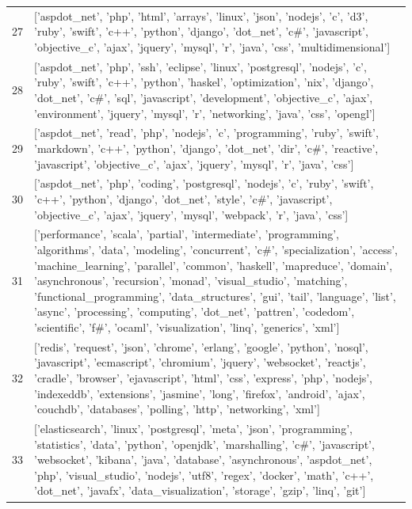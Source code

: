 \begin{center}
\begin{longtable}{|p{1.5cm}|p{12.5cm}|}
            27 & ['aspdot\_net', 'php', 'html', 'arrays', 'linux', 'json', 'nodejs', 'c', 'd3', 'ruby', 'swift', 'c++', 'python', 'django', 'dot\_net', 'c\#', 'javascript', 'objective\_c', 'ajax', 'jquery', 'mysql', 'r', 'java', 'css', 'multidimensional']  \\ 
            28 & ['aspdot\_net', 'php', 'ssh', 'eclipse', 'linux', 'postgresql', 'nodejs', 'c', 'ruby', 'swift', 'c++', 'python', 'haskel', 'optimization', 'nix', 'django', 'dot\_net', 'c\#', 'sql', 'javascript', 'development', 'objective\_c', 'ajax', 'environment', 'jquery', 'mysql', 'r', 'networking', 'java', 'css', 'opengl']  \\ 
            29 & ['aspdot\_net', 'read', 'php', 'nodejs', 'c', 'programming', 'ruby', 'swift', 'markdown', 'c++', 'python', 'django', 'dot\_net', 'dir', 'c\#', 'reactive', 'javascript', 'objective\_c', 'ajax', 'jquery', 'mysql', 'r', 'java', 'css']  \\ 
            30 & ['aspdot\_net', 'php', 'coding', 'postgresql', 'nodejs', 'c', 'ruby', 'swift', 'c++', 'python', 'django', 'dot\_net', 'style', 'c\#', 'javascript', 'objective\_c', 'ajax', 'jquery', 'mysql', 'webpack', 'r', 'java', 'css']  \\ 
            31 & ['performance', 'scala', 'partial', 'intermediate', 'programming', 'algorithms', 'data', 'modeling', 'concurrent', 'c\#', 'specialization', 'access', 'machine\_learning', 'parallel', 'common', 'haskell', 'mapreduce', 'domain', 'asynchronous', 'recursion', 'monad', 'visual\_studio', 'matching', 'functional\_programming', 'data\_structures', 'gui', 'tail', 'language', 'list', 'async', 'processing', 'computing', 'dot\_net', 'pattren', 'codedom', 'scientific', 'f\#', 'ocaml', 'visualization', 'linq', 'generics', 'xml']  \\ 
            32 & ['redis', 'request', 'json', 'chrome', 'erlang', 'google', 'python', 'nosql', 'javascript', 'ecmascript', 'chromium', 'jquery', 'websocket', 'reactjs', 'cradle', 'browser', 'ejavascript', 'html', 'css', 'express', 'php', 'nodejs', 'indexeddb', 'extensions', 'jasmine', 'long', 'firefox', 'android', 'ajax', 'couchdb', 'databases', 'polling', 'http', 'networking', 'xml']  \\ 
            33 & ['elasticsearch', 'linux', 'postgresql', 'meta', 'json', 'programming', 'statistics', 'data', 'python', 'openjdk', 'marshalling', 'c\#', 'javascript', 'websocket', 'kibana', 'java', 'database', 'asynchronous', 'aspdot\_net', 'php', 'visual\_studio', 'nodejs', 'utf8', 'regex', 'docker', 'math', 'c++', 'dot\_net', 'javafx', 'data\_visualization', 'storage', 'gzip', 'linq', 'git']  \\ 

\end{longtable}
\end{center}

